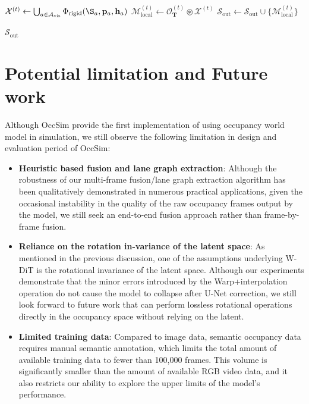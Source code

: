 \begin{algorithm}[htb]
\begin{algorithmic}[1]
    \State $\mathcal{X}^{(t)} \gets \bigcup_{a \in \mathcal{A}_{\text{vis}}} \Phi_{\text{rigid}}(\S_a, \mathbf{p}_a, \mathbf{h}_a)$ \hfill {}
    \State $\mathcal{M}_{\text{local}}^{(t)} \gets \mathcal{O}_{\mathbf{T}}^{(t)} \circledast \mathcal{X}^{(t)}$ \hfill {}
    \State $\mathcal{S}_{\text{out}} \gets \mathcal{S}_{\text{out}} \cup \{\mathcal{M}_{\text{local}}^{(t)}\}$ 

    \EndFor

\State \Return $\mathcal{S}_{\text{out}}$

\end{algorithmic}
\end{algorithm}

\section{Potential limitation and Future work}

Although OccSim provide the first implementation of using occupancy world model in simulation, we still observe the following limitation in design and evaluation period of OccSim:

\begin{itemize}
    \item \textbf{Heuristic based fusion and lane graph extraction}: Although the robustness of our multi-frame fusion/lane graph extraction algorithm has been qualitatively demonstrated in numerous practical applications, given the occasional instability in the quality of the raw occupancy frames output by the model, we still seek an end-to-end fusion approach rather than frame-by-frame fusion.
    
    \item \textbf{Reliance on the rotation in-variance of the latent space}: As mentioned in the previous discussion, one of the assumptions underlying W-DiT is the rotational invariance of the latent space. Although our experiments demonstrate that the minor errors introduced by the Warp+interpolation operation do not cause the model to collapse after U-Net correction, we still look forward to future work that can perform lossless rotational operations directly in the occupancy space without relying on the latent.
    
    \item \textbf{Limited training data}: Compared to image data, semantic occupancy data requires manual semantic annotation, which limits the total amount of available training data to fewer than 100,000 frames. This volume is significantly smaller than the amount of available RGB video data, and it also restricts our ability to explore the upper limits of the model’s performance. 
    
\end{itemize}

